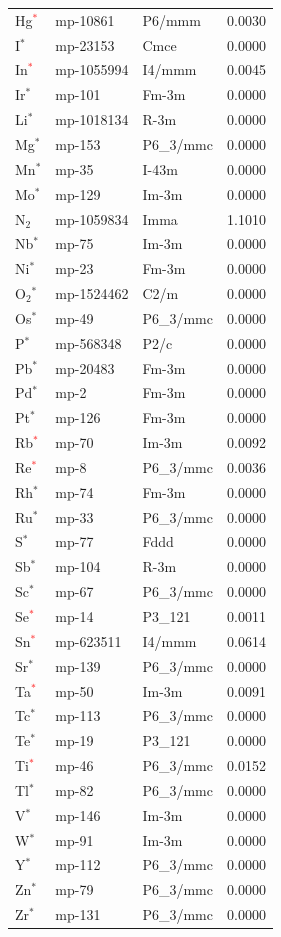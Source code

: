 \begin{longtable}{@{}llll@{}}
Hg\textcolor{red}{$^*$} & mp-10861 & P6/mmm & 0.0030 \\
I$^*$ & mp-23153 & Cmce & 0.0000 \\
In\textcolor{red}{$^*$} & mp-1055994 & I4/mmm & 0.0045 \\
Ir$^*$ & mp-101 & Fm-3m & 0.0000 \\
Li$^*$ & mp-1018134 & R-3m & 0.0000 \\
Mg$^*$ & mp-153 & P6\_3/mmc & 0.0000 \\
Mn$^*$ & mp-35 & I-43m & 0.0000 \\
Mo$^*$ & mp-129 & Im-3m & 0.0000 \\
N$_{2}$ & mp-1059834 & Imma & 1.1010 \\
Nb$^*$ & mp-75 & Im-3m & 0.0000 \\
Ni$^*$ & mp-23 & Fm-3m & 0.0000 \\
O$_{2}$$^*$ & mp-1524462 & C2/m & 0.0000 \\
Os$^*$ & mp-49 & P6\_3/mmc & 0.0000 \\
P$^*$ & mp-568348 & P2/c & 0.0000 \\
Pb$^*$ & mp-20483 & Fm-3m & 0.0000 \\
Pd$^*$ & mp-2 & Fm-3m & 0.0000 \\
Pt$^*$ & mp-126 & Fm-3m & 0.0000 \\
Rb\textcolor{red}{$^*$} & mp-70 & Im-3m & 0.0092 \\
Re\textcolor{red}{$^*$} & mp-8 & P6\_3/mmc & 0.0036 \\
Rh$^*$ & mp-74 & Fm-3m & 0.0000 \\
Ru$^*$ & mp-33 & P6\_3/mmc & 0.0000 \\
S$^*$ & mp-77 & Fddd & 0.0000 \\
Sb$^*$ & mp-104 & R-3m & 0.0000 \\
Sc$^*$ & mp-67 & P6\_3/mmc & 0.0000 \\
Se\textcolor{red}{$^*$} & mp-14 & P3\_121 & 0.0011 \\
Sn\textcolor{red}{$^*$} & mp-623511 & I4/mmm & 0.0614 \\
Sr$^*$ & mp-139 & P6\_3/mmc & 0.0000 \\
Ta\textcolor{red}{$^*$} & mp-50 & Im-3m & 0.0091 \\
Tc$^*$ & mp-113 & P6\_3/mmc & 0.0000 \\
Te$^*$ & mp-19 & P3\_121 & 0.0000 \\
Ti\textcolor{red}{$^*$} & mp-46 & P6\_3/mmc & 0.0152 \\
Tl$^*$ & mp-82 & P6\_3/mmc & 0.0000 \\
V$^*$ & mp-146 & Im-3m & 0.0000 \\
W$^*$ & mp-91 & Im-3m & 0.0000 \\
Y$^*$ & mp-112 & P6\_3/mmc & 0.0000 \\
Zn$^*$ & mp-79 & P6\_3/mmc & 0.0000 \\
Zr$^*$ & mp-131 & P6\_3/mmc & 0.0000 \\
\end{longtable}
